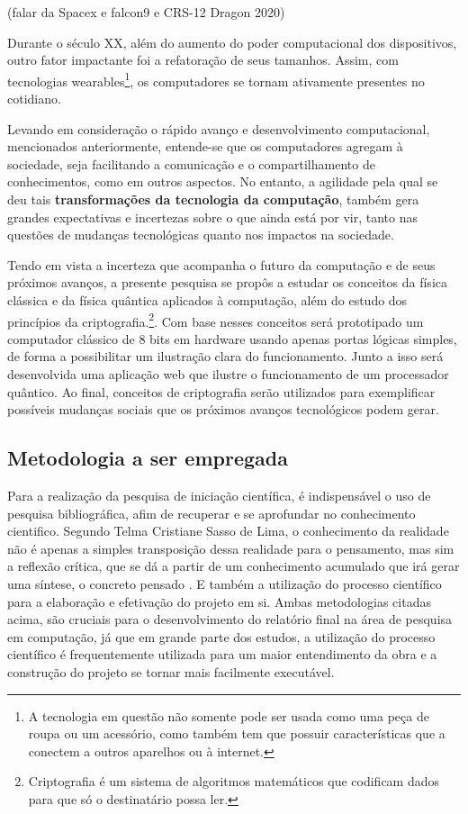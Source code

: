 (falar da Spacex e falcon9 e CRS-12 Dragon 2020)

Durante o século XX, além do aumento do poder computacional dos dispositivos, outro fator impactante foi a refatoração de seus tamanhos. Assim, com tecnologias wearables\footnote{A tecnologia em questão não somente pode ser usada como uma peça de roupa ou um acessório, como também tem que possuir características que a conectem a outros aparelhos ou à internet.}, os computadores se tornam ativamente presentes no cotidiano.

Levando em consideração o rápido avanço e desenvolvimento computacional, mencionados anteriormente, entende-se que os computadores agregam à sociedade, seja facilitando a comunicação e o compartilhamento de conhecimentos, como em outros aspectos. No entanto, a agilidade pela qual se deu tais \textbf{transformações da tecnologia da computação}, também gera grandes expectativas e incertezas sobre o que ainda está por vir, tanto nas questões de mudanças tecnológicas quanto nos impactos na sociedade.

Tendo em vista a incerteza que acompanha o futuro da computação e de seus próximos avanços, a presente pesquisa se propôs a estudar os conceitos da física clássica e da física quântica aplicados à computação, além do estudo dos princípios da criptografia.\footnote{Criptografia é um sistema de algoritmos matemáticos que codificam dados para que só o destinatário possa ler.}. Com base nesses conceitos será prototipado um computador clássico de 8 bits em hardware usando apenas portas lógicas simples, de forma a possibilitar um ilustração clara do funcionamento. Junto a isso será desenvolvida uma aplicação web que ilustre o funcionamento de um processador quântico. Ao final, conceitos de criptografia serão utilizados para exemplificar possíveis mudanças sociais que os próximos avanços tecnológicos podem gerar.

\subsection{Metodologia a ser empregada}
Para a realização da pesquisa de iniciação científica, é indispensável o uso de pesquisa bibliográfica, afim de recuperar e se aprofundar no conhecimento cientifico. Segundo Telma Cristiane Sasso de Lima, o conhecimento da realidade não é apenas a simples transposição dessa realidade para o pensamento, mas sim a reflexão crítica, que se dá a partir de um conhecimento acumulado que irá gerar uma síntese, o concreto pensado \cite{1}. E também a utilização do processo científico para a elaboração e efetivação do projeto em si. Ambas metodologias citadas acima, são cruciais para o desenvolvimento do relatório final na área de pesquisa em computação, já que em grande parte dos estudos, a utilização do processo científico é frequentemente utilizada para um maior entendimento da obra e a construção do projeto se tornar mais facilmente executável.

